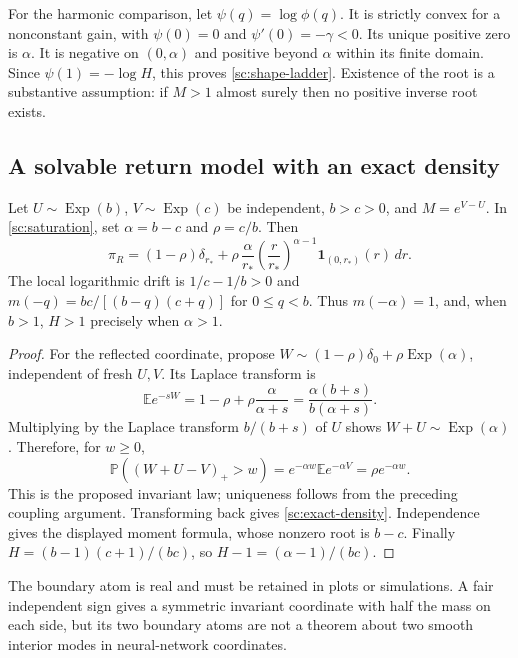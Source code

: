 For the harmonic comparison, let \(\psi(q)=\log\phi(q)\).
It is strictly convex for a nonconstant gain, with \(\psi(0)=0\) and
\(\psi'(0)=-\gamma<0\). Its unique positive zero is \(\alpha\).
It is negative on \((0,\alpha)\) and positive beyond \(\alpha\)
within its finite domain. Since \(\psi(1)=-\log H\), this proves
\eqref{sc:shape-ladder}. Existence of the root is a substantive assumption:
if \(M>1\) almost surely then no positive inverse root exists.

\subsection{A solvable return model with an exact density}
\begin{proposition}\label{sc:solvable}
Let \(U\sim\operatorname{Exp}(b)\), \(V\sim\operatorname{Exp}(c)\) be
independent, \(b>c>0\), and \(M=e^{V-U}\). In
\eqref{sc:saturation}, set \(\alpha=b-c\) and \(\rho=c/b\). Then
\begin{equation}
 \pi_R=(1-\rho)\delta_{r_*}
 +\rho\,\frac\alpha{r_*}\left(\frac r{r_*}\right)^{\alpha-1}
             \mathbf1_{(0,r_*)}(r)\,dr.
 \label{sc:exact-density}
\end{equation}
The local logarithmic drift is \(1/c-1/b>0\) and
\(m(-q)=bc/[(b-q)(c+q)]\) for \(0\le q<b\).
Thus \(m(-\alpha)=1\), and, when \(b>1\), \(H>1\) precisely when
\(\alpha>1\).
\end{proposition}
\begin{proof}
For the reflected coordinate, propose
\(W\sim(1-\rho)\delta_0+\rho\operatorname{Exp}(\alpha)\), independent
of fresh \(U,V\). Its Laplace transform is
\[
 \mathbb E e^{-sW}=1-\rho+\rho\frac\alpha{\alpha+s}
   =\frac{\alpha(b+s)}{b(\alpha+s)}.
\]
Multiplying by the Laplace transform \(b/(b+s)\) of \(U\) shows
\(W+U\sim\operatorname{Exp}(\alpha)\). Therefore, for \(w\ge0\),
\[
 \mathbb P((W+U-V)_+>w)
 =e^{-\alpha w}\mathbb E e^{-\alpha V}
 =\rho e^{-\alpha w}.
\]
This is the proposed invariant law; uniqueness follows from the preceding
coupling argument. Transforming back gives \eqref{sc:exact-density}.
Independence gives the displayed moment formula, whose nonzero root is
\(b-c\). Finally
\(H=(b-1)(c+1)/(bc)\), so
\(H-1=(\alpha-1)/(bc)\).
\end{proof}
The boundary atom is real and must be retained in plots or simulations.
A fair independent sign gives a symmetric invariant coordinate with
half the mass on each side, but its two boundary atoms are not a theorem
about two smooth interior modes in neural-network coordinates.

